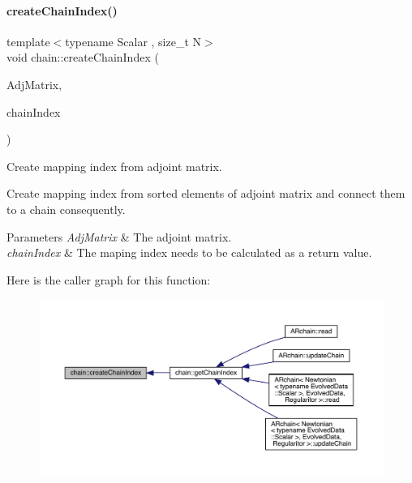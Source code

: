 \paragraph{\texorpdfstring{create\+Chain\+Index()}{createChainIndex()}}
{\footnotesize\ttfamily template$<$typename Scalar , size\+\_\+t N$>$ \\
void chain\+::create\+Chain\+Index (\begin{DoxyParamCaption}\item[{\mbox{\hyperlink{namespacechain_a3a021b84403e03113e1dcd61ba304963}{Node\+Array}}$<$ Scalar, N $\ast$(N -\/ 1)/2 $>$ \&}]{Adj\+Matrix,  }\item[{\mbox{\hyperlink{namespacechain_aa40d2da395c0ac2bc5f37832442ac403}{Index\+Array}}$<$ N $>$ \&}]{chain\+Index }\end{DoxyParamCaption})}



Create mapping index from adjoint matrix. 

Create mapping index from sorted elements of adjoint matrix and connect them to a chain consequently. 
\begin{DoxyParams}{Parameters}
{\em Adj\+Matrix} & The adjoint matrix. \\
\hline
{\em chain\+Index} & The maping index needs to be calculated as a return value. \\
\hline
\end{DoxyParams}
Here is the caller graph for this function\+:\nopagebreak
\begin{figure}[H]
\begin{center}
\leavevmode
\includegraphics[width=350pt]{namespacechain_ae008a8273beabf1473c347994197ef53_icgraph}
\end{center}
\end{figure}
\mbox{\label{namespacechain_a3e7b0a001442f121ce1408e7c9d12016}} 
